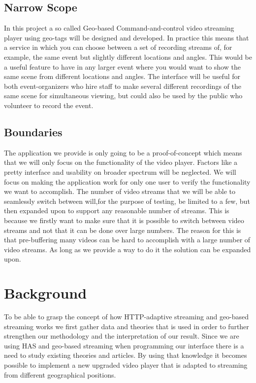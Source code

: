 \documentclass[9pt,a4paper]{acmproc}
\begin{document}
\subsection{Narrow Scope}
In this project a so called Geo-based Command-and-control video streaming player using geo-tags will be designed and developed. In practice this means that a service in which you can choose between a set of recording streams of, for example, the same event but slightly different locations and angles. This would be a useful feature to have in any larger event where you would want to show the same scene from different locations and angles. The interface will be useful for both event-organizers who hire staff to make several different recordings of the same scene for simultaneous viewing, but could also be used by the public who volunteer to record the event.

\subsection{Boundaries}
The application we provide is only going to be a proof-of-concept which means that we will only focus on the functionality of the video player. Factors like a pretty interface and usability on broader spectrum will be neglected. We will focus on making the application work for only one user to verify the functionality we want to accomplish. The number of video streams that we will be able to seamlessly switch between will,for the purpose of testing, be limited to a few, but then expanded upon to support any reasonable number of streams. This is because we firstly want to make sure that it is possible to switch between video streams and not that it can be done over large numbers. The reason for this is that pre-buffering many videos can be hard to accomplish with a large number of video streams. As long as we provide a way to do it the solution can be expanded upon.


\section{Background}
To be able to grasp the concept of how HTTP-adaptive streaming and geo-based streaming works we first gather data and theories that is used in order to further strengthen our methodology and the interpretation of our result. Since we are using HAS and geo-based streaming when programming our interface there is a need to study existing theories and articles. By using that knowledge it becomes possible to implement a new upgraded video player that is adapted to streaming from different geographical positions.
\end{document}
